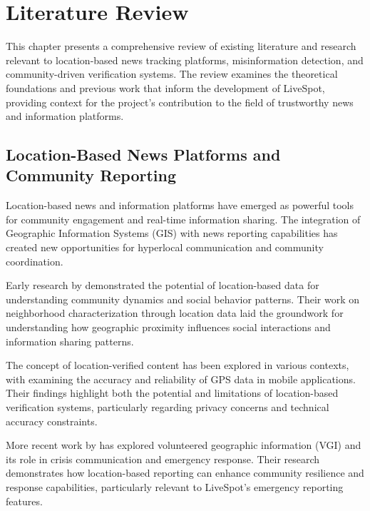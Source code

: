\chapter{Literature Review}
\label{ch:lit_rev} %

This chapter presents a comprehensive review of existing literature and research relevant to location-based news tracking platforms, misinformation detection, and community-driven verification systems. The review examines the theoretical foundations and previous work that inform the development of LiveSpot, providing context for the project's contribution to the field of trustworthy news and information platforms.

\section{Location-Based News Platforms and Community Reporting}
\label{sec:location_social_media}

Location-based news and information platforms have emerged as powerful tools for community engagement and real-time information sharing. The integration of Geographic Information Systems (GIS) with news reporting capabilities has created new opportunities for hyperlocal communication and community coordination.

Early research by \cite{cranshaw2012livehoods} demonstrated the potential of location-based data for understanding community dynamics and social behavior patterns. Their work on neighborhood characterization through location data laid the groundwork for understanding how geographic proximity influences social interactions and information sharing patterns.

The concept of location-verified content has been explored in various contexts, with \cite{zandbergen2011accuracy} examining the accuracy and reliability of GPS data in mobile applications. Their findings highlight both the potential and limitations of location-based verification systems, particularly regarding privacy concerns and technical accuracy constraints.

More recent work by \cite{sui2013volunteered} has explored volunteered geographic information (VGI) and its role in crisis communication and emergency response. Their research demonstrates how location-based reporting can enhance community resilience and response capabilities, particularly relevant to LiveSpot's emergency reporting features.

